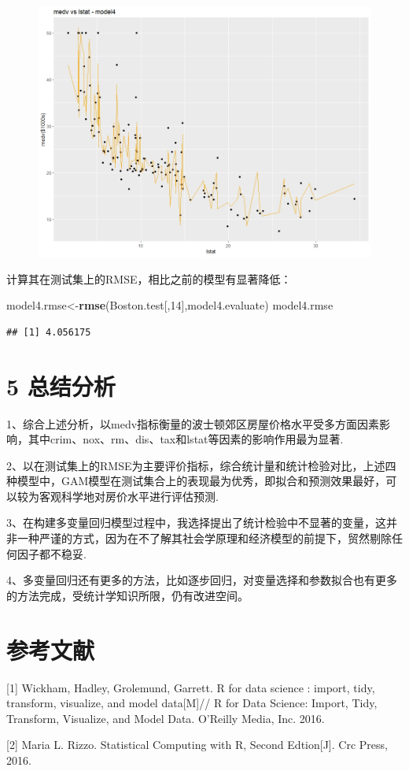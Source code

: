 \documentclass[UTF-8]{ctexart}
\newenvironment{Shaded}{\begin{snugshade}}{\end{snugshade}}
\newcommand{\DecValTok}[1]{\textcolor[rgb]{0.00,0.00,0.81}{#1}}
\newcommand{\KeywordTok}[1]{\textcolor[rgb]{0.13,0.29,0.53}{\textbf{#1}}}
\newcommand{\NormalTok}[1]{#1}
\begin{document}
\begin{figure}[H]
	\centering
	\includegraphics[width=0.7\linewidth]{model4}
	\label{bdc1}
\end{figure}

计算其在测试集上的RMSE，相比之前的模型有显著降低：
		
		\begin{Shaded}
			\begin{Highlighting}[]
\NormalTok{model4.rmse<-}\KeywordTok{rmse}\NormalTok{(Boston.test[,}\DecValTok{14}\NormalTok{],model4.evaluate)}
\NormalTok{model4.rmse}
			\end{Highlighting}
		\end{Shaded}
	
\begin{verbatim}
## [1] 4.056175
\end{verbatim}

\section{5 总结分析}

1、综合上述分析，以medv指标衡量的波士顿郊区房屋价格水平受多方面因素影响，其中crim、nox、rm、dis、tax和lstat等因素的影响作用最为显著.

2、以在测试集上的RMSE为主要评价指标，综合统计量和统计检验对比，上述四种模型中，GAM模型在测试集合上的表现最为优秀，即拟合和预测效果最好，可以较为客观科学地对房价水平进行评估预测.

3、在构建多变量回归模型过程中，我选择提出了统计检验中不显著的变量，这并非一种严谨的方式，因为在不了解其社会学原理和经济模型的前提下，贸然剔除任何因子都不稳妥.

4、多变量回归还有更多的方法，比如逐步回归，对变量选择和参数拟合也有更多的方法完成，受统计学知识所限，仍有改进空间。

\section{参考文献}

[1] Wickham, Hadley, Grolemund, Garrett. R for data science : import, tidy, transform, visualize, and model data[M]// R for Data Science: Import, Tidy, Transform, Visualize, and Model Data. O'Reilly Media, Inc. 2016.

[2] Maria L. Rizzo. Statistical Computing with R, Second Edtion[J]. Crc Press, 2016.
\end{document}
